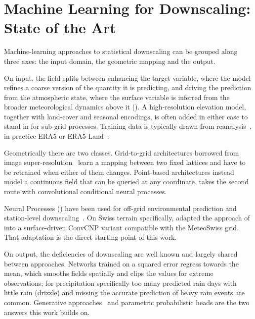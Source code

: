 \section{Machine Learning for Downscaling: State of the Art}\label{sec:intro-sota}

Machine-learning approaches to statistical downscaling can be grouped along three axes: the input domain, the geometric mapping and the output.

On input, the field splits between enhancing the target variable, where the model refines a coarse version of the quantity it is predicting, and driving the prediction from the atmospheric state, where the surface variable is inferred from the broader meteorological dynamics above it (). A high-resolution elevation model, together with land-cover and seasonal encodings, is often added in either case to stand in for sub-grid processes. Training data is typically drawn from reanalysis~\cite{rampal2024enhancing}, in practice ERA5 or ERA5-Land~\cite{hersbach2020era5, munozsabater2021era5land}.

Geometrically there are two classes. Grid-to-grid architectures borrowed from image super-resolution~\cite{vandal2017deepsd} learn a mapping between two fixed lattices and have to be retrained when either of them changes. Point-based architectures instead model a continuous field that can be queried at any coordinate. \textcite{vaughan2022convcnp} takes the second route with convolutional conditional neural processes. 


Neural Processes () have been used for off-grid environmental prediction and station-level downscaling~\cite{andersson2023convgnp}. On Swiss terrain specifically, \textcite{passos} adapted the approach of \textcite{vaughan2022convcnp} into a surface-driven ConvCNP variant compatible with the MeteoSwiss grid. That adaptation is the direct starting point of this work.

On output, the deficiencies of downscaling are well known and largely shared between approaches. Networks trained on a squared error regress towards the mean, which smooths fields spatially and clips the values for extreme observations; for precipitation specifically too many predicted rain days with little rain (drizzle) and missing the accurate prediction of heavy rain events are common. Generative approaches~\cite{harris2022generative} and parametric probabilistic heads are the two answers this work builds on.


